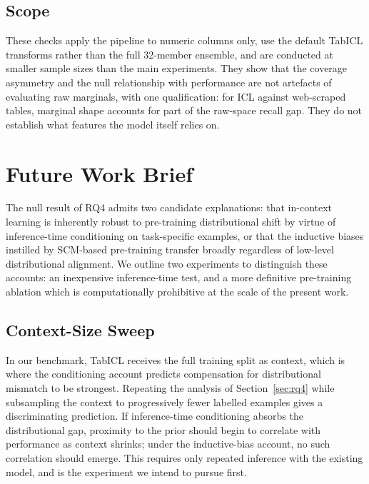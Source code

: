 \documentclass{article}
\begin{document}
\subsection{Scope}

These checks apply the pipeline to numeric columns only, use the default TabICL transforms rather than the full 32-member ensemble, and are conducted at smaller sample sizes than the main experiments.
They show that the coverage asymmetry and the null relationship with performance are not artefacts of evaluating raw marginals, with one qualification: for ICL against web-scraped tables, marginal shape accounts for part of the raw-space recall gap.
They do not establish what features the model itself relies on.

\newpage
\clearpage

\section{Future Work Brief}
\label{sec:future-work}

The null result of RQ4 admits two candidate explanations: that in-context learning is inherently
robust to pre-training distributional shift by virtue of inference-time conditioning on task-specific
examples, or that the inductive biases instilled by SCM-based pre-training transfer broadly
regardless of low-level distributional alignment. We outline two experiments to distinguish
these accounts: an inexpensive inference-time test, and a more definitive pre-training
ablation which is computationally prohibitive at the scale of the present work.

\subsection*{Context-Size Sweep}

In our benchmark, TabICL receives the full training split as context, which is where the
conditioning account predicts compensation for distributional mismatch to be strongest.
Repeating the analysis of Section~\ref{sec:rq4} while subsampling the context to
progressively fewer labelled examples gives a discriminating prediction. If inference-time
conditioning absorbs the distributional gap, proximity to the prior should begin to correlate
with performance as context shrinks; under the inductive-bias account, no such correlation
should emerge. This requires only repeated inference with the existing model, and is the
experiment we intend to pursue first.
\end{document}
